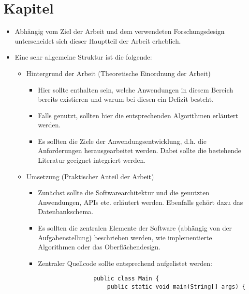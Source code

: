 %
\chapter{Kapitel}
\label{chap:chapters} 

\begin{itemize}
	\item Abhängig vom Ziel der Arbeit und dem verwendeten Forschungsdesign unterscheidet sich dieser Hauptteil der Arbeit erheblich. 
	\item Eine sehr allgemeine Struktur ist die folgende:
	\begin{itemize}
		\item Hintergrund der Arbeit (Theoretische Einordnung der Arbeit) 
		 	\begin{itemize}
		 		\item Hier sollte enthalten sein, welche Anwendungen in diesem Bereich bereits existieren und warum bei diesen ein Defizit besteht. 
				\item Falls genutzt, sollten hier die entsprechenden Algorithmen erläutert werden.
				\item Es sollten die Ziele der Anwendungsentwicklung, d.h. die Anforderungen herausgearbeitet werden. Dabei sollte die bestehende Literatur geeignet integriert werden.
		 	\end{itemize}
		\item Umsetzung (Praktischer Anteil der Arbeit)
			\begin{itemize}
				\item Zunächst sollte die Softwarearchitektur und die genutzten Anwendungen, APIs etc. erläutert werden. Ebenfalls gehört dazu das Datenbankschema.
				\item Es sollten die zentralen Elemente der Software (abhängig von der Aufgabenstellung) beschrieben werden, wie implementierte Algorithmen oder das Oberflächendesign.
				\item Zentraler Quellcode sollte entsprechend aufgelistet werden:
				\lstset{language=Java,basicstyle=\footnotesize,numbers=left,showstringspaces=false,frame=single}
				\begin{lstlisting}
				public class Main {
					public static void main(String[] args) {

\end{lstlisting}
\end{itemize}
\end{itemize}
\end{itemize}
